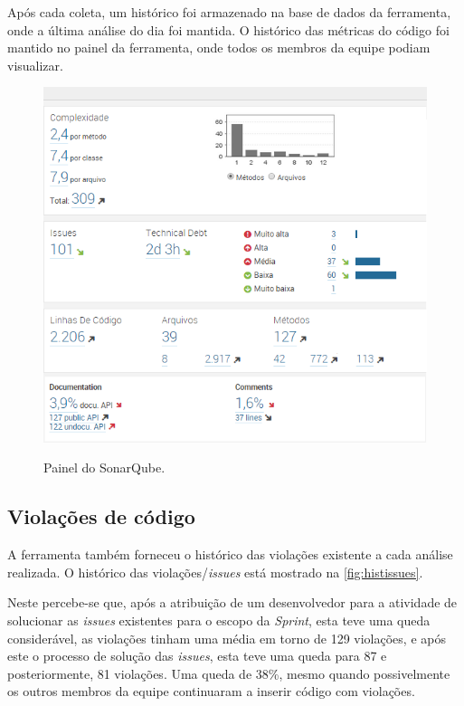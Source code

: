 Após cada coleta, um histórico foi armazenado na base de dados da ferramenta, onde a última análise do dia foi mantida. O histórico das métricas do código foi mantido no painel da ferramenta, onde todos os membros da equipe podiam visualizar. 

\begin{figure}[H]
\centering 
\caption[Painel do SonarQube]{Painel do SonarQube.}\includegraphics[scale=0.9]{./images/dashboardSonar}
\label{fig:sonar}
\end{figure}

\subsection{Violações de código}
A ferramenta também forneceu o histórico das violações existente a cada análise realizada. O histórico das violações/\textit{issues} está mostrado na \autoref{fig:histissues}.

Neste percebe-se que, após a atribuição de um desenvolvedor para a atividade de solucionar as \textit{issues} existentes para o escopo da \textit{Sprint}, esta teve uma queda considerável, as violações tinham uma média em torno de 129 violações, e após este o processo de solução das \textit{issues}, esta teve uma queda para 87 e posteriormente, 81 violações. Uma queda de 38\%,  mesmo quando possivelmente os outros membros da equipe continuaram a inserir código com violações.

